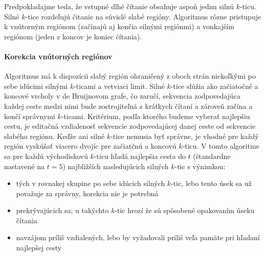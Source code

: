 Predpokladajme teda, že vstupné dlhé čítanie obsahuje aspoň jednu silnú $k$-ticu. Silné $k$-tice rozdeľujú čitanie na súvislé slabé regióny. Algoritmus rôzne pristupuje k vnútorným regiónom (začínajú aj končia silnými regiónmi) a vonkajším regiónom (jeden z koncov je koniec čítania).

\paragraph{Korekcia vnútorných regiónov}

Algoritmus má k dispozícii slabý región ohraničený z oboch strán niekoľkými po sebe idúcimi silnými $k$-ticami a vetviaci limit. Silné $k$-tice slúžia ako začiatočné a koncové vrcholy v de Bruijnovom grafe, čo zaručí, sekvencia zodpovedajúca každej ceste medzi nimi bude zostrojiteľná z krátkych čítaní a zároveň začína a končí správnymi $k$-ticami. Kritérium, podľa ktorého budeme vyberať najlepšiu cestu, je editačná vzdialenosť sekvencie zodpovedajúcej danej ceste od sekvencie slabého regiónu.
Keďže ani silné $k$-tice nemusia byť správne, je vhodné pre každý región vyskúšať viacero dvojíc pre začiatčnú a koncovú $k$-ticu. V tomto algoritme sa pre každú východiskovú $k$-ticu hľadá najlepšia cesta do $t$ (štandardne nastavené na $t = 5$) najbližších nasledujúcich silných $k$-tic s výnimkou:
\begin{itemize}
\item tých v rovnakej skupine po sebe idúcich silných $k$-tic, lebo tento úsek sa už považuje za správny, korekcia nie je potrebná
\item prekrývajúcich sa; u takýchto $k$-tic hrozí že sú spôsobené opakovaním úseku čítania
\item navzájom príliš vzdialených, lebo by vyžadovali príliš veľa pamäte pri hľadaní najlepšej cesty
\end{itemize}

